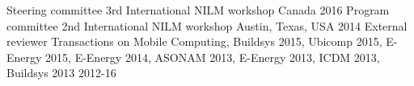 \begin{cvhonors}
  \cvhonor
    {Steering committee}
    {3rd International NILM workshop}
    {Canada}
    {2016}
  \cvhonor
    {Program committee}
    {2nd International NILM workshop}
    {Austin, Texas, USA}
    {2014}
    \cvhonor
    {External reviewer}
    {Transactions on Mobile Computing, Buildsys 2015, Ubicomp 2015, E-Energy 2015, E-Energy 2014, ASONAM 2013, E-Energy 2013, ICDM 2013, Buildsys 2013}
    {}
    {2012-16}
\end{cvhonors}

